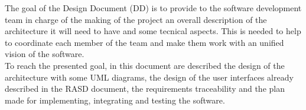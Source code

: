 The goal of the Design Document (DD) is to provide to the software development team in charge of the making of the project an overall description of the architecture it will need to have and some tecnical aspects. This is needed to help to coordinate each member of the team and make them work with an unified vision of the software. \\
To reach the presented goal, in this document are described the design of the architecture with some UML diagrams, the design of the user interfaces already described in the RASD document, the requirements traceability and the plan made for implementing, integrating and testing the software.
